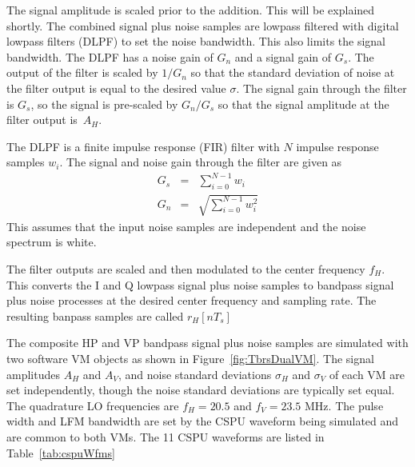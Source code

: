 \documentclass[12pt,english]{article}
\newcommand{\ls}{\left[}
\newcommand{\rs}{\right]}
\begin{document}
The signal amplitude is scaled prior to the addition. This will be
explained shortly. The combined signal plus noise samples are lowpass
filtered with digital lowpass filters (DLPF) to set the noise
bandwidth. This also limits the signal bandwidth. The DLPF has a noise
gain of $G_n$ and a signal gain of $G_s$. The output of the filter is
scaled by $1/G_n$ so that the standard deviation of noise at the
filter output is equal to the desired value $\sigma$. The signal gain
through the filter is $G_s$, so the signal is pre-scaled by $G_n/G_s$
so that the signal amplitude at the filter output is~$A_H$.

The DLPF is a finite impulse response (FIR) filter with $N$ impulse
response samples $w_i$. The signal and noise gain through the filter
are given as
\begin{eqnarray*}\label{eq:firSignalNoiseGain}
  G_s &=& \sum_{i=0}^{N-1} w_i \\
  G_n &=& \sqrt{\sum_{i=0}^{N-1} w^2_i}
\end{eqnarray*}
This assumes that the input noise samples are independent and the
noise spectrum is white.

The filter outputs are scaled and then modulated to the center
frequency $f_H$. This converts the I and Q lowpass signal plus noise
samples to bandpass signal plus noise processes at the desired center
frequency and sampling rate. The resulting banpass samples are called
$r_H \ls n T_s \rs$

The composite HP and VP bandpass signal plus noise samples are
simulated with two software VM objects as shown in
Figure~\vref{fig:TbrsDualVM}.  The signal amplitudes $A_H$ and
$A_V$, and noise standard deviations $\sigma_H$ and $\sigma_V$ of each
VM are set independently, though the noise standard deviations are
typically set equal. The quadrature LO frequencies are $f_H = 20.5$
and $f_V = 23.5$ MHz. The pulse width and LFM bandwidth are set by the
CSPU waveform being simulated and are common to both VMs. The 11 CSPU
waveforms are listed in Table~\vref{tab:cspuWfms}
\end{document}
